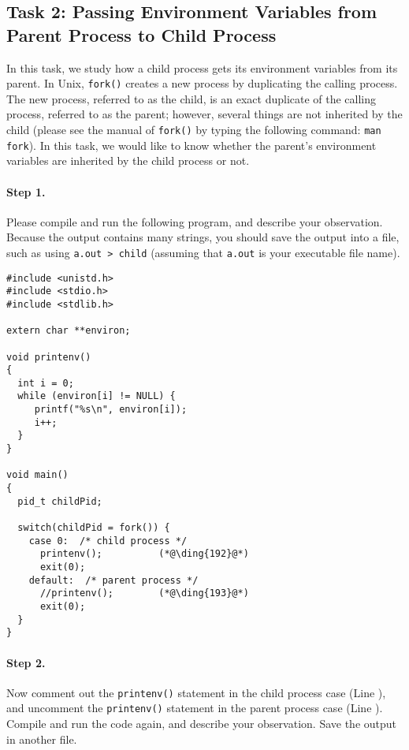 \subsection{Task 2: Passing Environment Variables from Parent Process to Child Process}


In this task, we study how a child process gets 
its environment variables from its parent. In Unix,
{\tt fork()} creates a new process by duplicating the calling process.
The new process, referred to as the child, is an exact duplicate of the calling 
process, referred to as the parent; however, several things 
are not inherited by the child (please see the manual of {\tt fork()} by
typing the following command: {\tt man fork}). In this task,
we would like to know whether the parent's environment variables
are inherited by the child process or not.


\paragraph{Step 1.} Please compile and run the following
program,  and describe your observation. Because the output 
contains many strings, you should save the output into a file, such as
using {\tt a.out > child} (assuming that {\tt a.out} is your 
executable file name).


\begin{lstlisting}
#include <unistd.h>
#include <stdio.h>
#include <stdlib.h>

extern char **environ;

void printenv()
{
  int i = 0;
  while (environ[i] != NULL) {
     printf("%s\n", environ[i]);
     i++;
  }
}

void main()
{
  pid_t childPid;

  switch(childPid = fork()) {
    case 0:  /* child process */
      printenv();          (*@\ding{192}@*)
      exit(0);
    default:  /* parent process */
      //printenv();        (*@\ding{193}@*)
      exit(0);
  }
}
\end{lstlisting}

\paragraph{Step 2.} Now comment out the {\tt printenv()} statement in
the child process case (Line ), 
and uncomment the {\tt printenv()} statement in
the parent process case (Line ). 
Compile and run the code again, and describe your 
observation. Save the output in another file.


